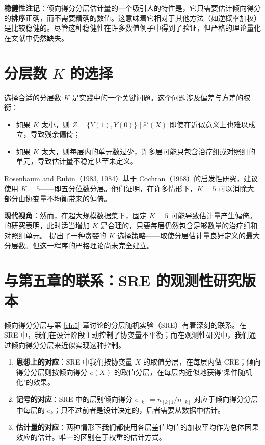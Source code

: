 \textbf{稳健性注记}：倾向得分分层估计量的一个吸引人的特性是，它只需要估计倾向得分的\textbf{排序}正确，而不需要精确的数值。这意味着它相对于其他方法（如逆概率加权）是比较稳健的。尽管这种稳健性在许多数值例子中得到了验证，但严格的理论量化在文献中仍然缺失。

\section{分层数 $K$ 的选择}\label{sec:13-choose-K}

选择合适的分层数 $K$ 是实践中的一个关键问题。这个问题涉及偏差与方差的权衡：

\begin{itemize}
  \item 如果 $K$ 太小，则 $Z \perp \{Y(1), Y(0)\} \mid \hat{e}'(X)$ 即使在近似意义上也难以成立，导致残余偏倚；
  \item 如果 $K$ 太大，则每层内的单元数过少，许多层可能只包含治疗组或对照组的单元，导致估计量不稳定甚至未定义。
\end{itemize}

Rosenbaum and Rubin（1983, 1984）基于 Cochran（1968）的启发性研究，建议使用 $K=5$——即五分位数分层。他们证明，在许多情形下，$K=5$ 可以消除大部分由协变量不均衡带来的偏倚。

\textbf{现代视角}：然而，在超大规模数据集下，固定 $K=5$ 可能导致估计量产生偏倚。\citet{LuncefordDavidian:2004} 的研究表明，此时适当增加 $K$ 是合理的，只要每层仍然包含足够数量的治疗组和对照组单元。\citet{WangEtAl:2020} 提出了一种贪婪的 $K$ 选择策略——取使分层估计量良好定义的最大分层数。但这一程序的严格理论尚未完全建立。

\section{与第五章的联系：SRE 的观测性研究版本}\label{sec:13-connection-ch5}

倾向得分分层与第 \ref{ch:5} 章讨论的分层随机实验（SRE）有着深刻的联系。在 SRE 中，我们在设计阶段主动控制了协变量不平衡；而在观测性研究中，我们通过倾向得分分层来近似实现这种控制。

\begin{enumerate}
  \item \textbf{思想上的对应}：SRE 中我们按协变量 $X$ 的取值分层，在每层内做 CRE；倾向得分分层则按倾向得分 $e(X)$ 的取值分层，在每层内近似地获得"条件随机化"的效果。
  \item \textbf{记号的对应}：SRE 中的层别倾向得分 $e_{[k]} = n_{[k]1}/n_{[k]}$ 对应于倾向得分分层中每层的 $e_k$；只不过前者是设计决定的，后者需要从数据中估计。
  \item \textbf{估计量的对应}：两种情形下我们都使用各层差值均值的加权平均作为总体因果效应的估计。唯一的区别在于权重的估计方式。
\end{enumerate}

